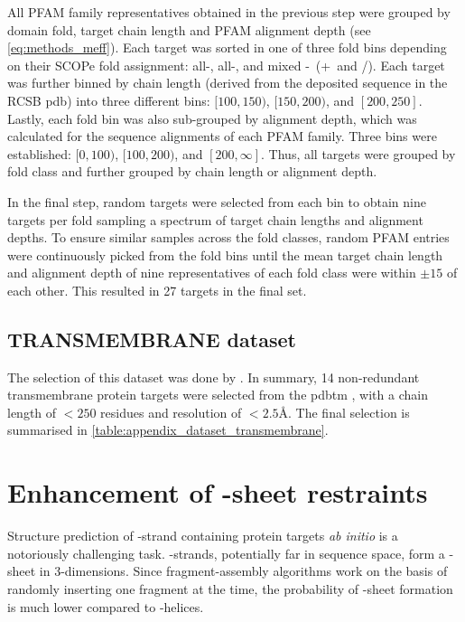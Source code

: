 All PFAM family representatives obtained in the previous step were grouped by domain fold, target chain length and PFAM alignment depth (see \cref{eq:methods_meff}). Each target was sorted in one of three fold bins depending on their SCOPe fold assignment: all-\textalpha, all-\textbeta, and mixed \textalpha-\textbeta\ (\textalpha+\textbeta\ and \textalpha/\textbeta). Each target was further binned by chain length (derived from the deposited sequence in the RCSB \gls{pdb}) into three different bins: $[100, 150)$, $[150, 200)$, and $[200, 250]$. Lastly, each fold bin was also sub-grouped by alignment depth, which was calculated for the sequence alignments of each PFAM family. Three bins were established: $[0, 100)$, $[100, 200)$, and $[200, \infty]$. Thus, all targets were grouped by fold class and further grouped by chain length or alignment depth.

In the final step, random targets were selected from each bin to obtain nine targets per fold sampling a spectrum of target chain lengths and alignment depths. To ensure similar samples across the fold classes, random PFAM entries were continuously picked from the fold bins until the mean target chain length and alignment depth of nine representatives of each fold class were within $\pm15$ of each other. This resulted in 27 targets in the final set.

\subsection{TRANSMEMBRANE dataset} \label{sec:methods_dataset_transmembrane}
The selection of this dataset was done by \textcite{Thomas2017-sh}. In summary, 14 non-redundant transmembrane protein targets were selected from the \gls{pdbtm} \cite{Tusnady2005-ns}, with a chain length of $<250$ residues and resolution of $<2.5$\AA. The final selection is summarised in \cref{table:appendix_dataset_transmembrane}.

\section{Enhancement of \textbeta-sheet restraints} \label{sec:methods_bbcontacts_addition}
Structure prediction of \textbeta-strand containing protein targets \textit{ab initio} is a notoriously challenging task. \textbeta-strands, potentially far in sequence space, form a \textbeta-sheet in 3-dimensions. Since fragment-assembly algorithms work on the basis of randomly inserting one fragment at the time, the probability of \textbeta-sheet formation is much lower compared to \textalpha-helices. 

